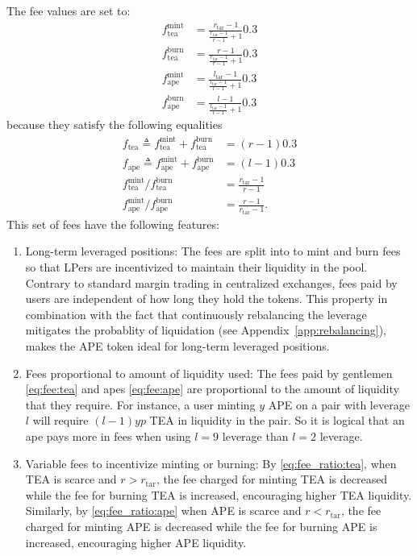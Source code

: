 \documentclass[journal,letterpaper,oneside,onecolumn,12pt]{IEEEtran}
\begin{document}
	The fee values are set to:
	\begin{align}
		f_\textrm{tea}^\textrm{mint} &= \frac{r_\textrm{tar}-1}{\frac{r_\textrm{tar}-1}{r-1}+1} 0.3 \\
		f_\textrm{tea}^\textrm{burn} &= \frac{r-1}{\frac{r_\textrm{tar}-1}{r-1}+1} 0.3 \\
		f_\textrm{ape}^\textrm{mint} &= \frac{l_\textrm{tar}-1}{\frac{l_\textrm{tar}-1}{l-1}+1} 0.3 \\
		f_\textrm{ape}^\textrm{burn} &= \frac{l-1}{\frac{l_\textrm{tar}-1}{l-1}+1} 0.3
	\end{align}
	because they satisfy the following equalities
	\begin{align}
		f_\textrm{tea} \triangleq f_\textrm{tea}^\textrm{mint} +f_\textrm{tea}^\textrm{burn} &= (r-1)0.3 \label{eq:fee:tea} \\
		f_\textrm{ape} \triangleq f_\textrm{ape}^\textrm{mint} +f_\textrm{ape}^\textrm{burn} &= (l-1)0.3 \label{eq:fee:ape} \\
		f_\textrm{tea}^\textrm{mint}/f_\textrm{tea}^\textrm{burn} &= \frac{r_\textrm{tar}-1}{r-1} \label{eq:fee_ratio:tea} \\
		f_\textrm{ape}^\textrm{mint}/f_\textrm{ape}^\textrm{burn} &= \frac{r-1}{r_\textrm{tar}-1}. \label{eq:fee_ratio:ape}
	\end{align}
	This set of fees have the following features:
	\begin{enumerate}
		\item Long-term leveraged positions: The fees are split into to mint and burn fees so that LPers are incentivized to maintain their liquidity in the pool. Contrary to standard margin trading in centralized exchanges, fees paid by users are independent of how long they hold the tokens. This property in combination with the fact that continuously rebalancing the leverage  mitigates the probablity of liquidation (see Appendix~\ref{app:rebalancing}), makes the APE token ideal for long-term leveraged positions.
		\item Fees proportional to amount of liquidity used: The fees paid by gentlemen \eqref{eq:fee:tea} and apes \eqref{eq:fee:ape} are proportional to the amount of liquidity that they require. For instance, a user minting $y$ APE on a pair with leverage $l$ will require $(l-1)yp$ TEA in liquidity in the pair. So it is logical that an ape pays more in fees when using $l=9$ leverage than $l=2$ leverage.
		\item Variable fees to incentivize minting or burning: By \eqref{eq:fee_ratio:tea}, when TEA is scarce and $r>r_\textrm{tar}$, the fee charged for minting TEA is decreased while the fee for burning TEA is increased, encouraging higher TEA liquidity. Similarly, by \eqref{eq:fee_ratio:ape} when APE is scarce and $r<r_\textrm{tar}$, the fee charged for minting APE is decreased while the fee for burning APE is increased, encouraging higher APE liquidity.
	\end{enumerate}
	 
\end{document}
